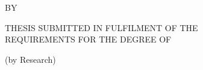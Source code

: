 \begin{titlepage}
    \centering
    \vspace*{1cm}
    {\Large\bfseries\MakeUppercase{\thesistitle}\par}
    \vspace{3cm}
    {\large\MakeUppercase{\thesisauthor}\par}
    \vfill
    {\large\MakeUppercase{\thesisuniversity}\par}
    \vspace{0.5cm}
    {\large\thesisyear\par}
\end{titlepage}

\begin{titlepage}
    \centering
    \vspace*{1cm}
    {\Large\bfseries\MakeUppercase{\thesistitle}\par}
    \vspace{3cm}
    {\large BY\par}
    \vspace{0.5cm}
    {\large\MakeUppercase{\thesisauthor}\par}
    \vspace{3cm}
    {\large THESIS SUBMITTED IN FULFILMENT OF THE\\
    REQUIREMENTS FOR THE DEGREE OF\\
    \MakeUppercase{\thesisdegree}\par}
    \vspace{2cm}
    {\large (by Research)\par}
    \vfill
    {\large\MakeUppercase{\thesisfaculty}\\[0.3cm]
    \MakeUppercase{\thesisuniversity}\par}
    \vspace{0.5cm}
    {\large\thesisyear\par}
\end{titlepage}
